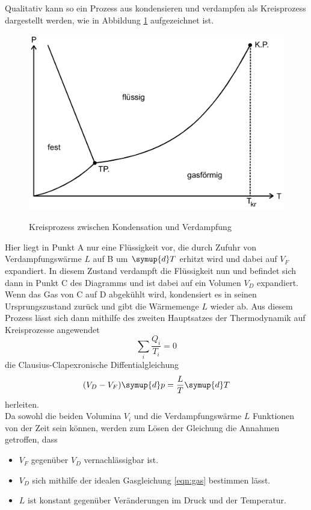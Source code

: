 \noindent Qualitativ kann so ein Prozess aus kondensieren und verdampfen als Kreisprozess dargestellt werden, wie
in Abbildung \ref{kreisprozess} aufgezeichnet ist.
\begin{figure}[H]
    \centering
    \caption{Kreisprozess zwischen Kondensation und Verdampfung}%
    \includegraphics{Bilder/Phasendiagramm}
    \label{kreisprozess}
\end{figure}
\noindent Hier liegt in Punkt A nur eine Flüssigkeit vor, die durch Zufuhr von Verdampfungswärme $L$ auf B um $\symup{d}T$ erhitzt wird 
und dabei auf $V_F$ expandiert. In diesem Zustand verdampft die Flüssigkeit nun und befindet sich dann in Punkt C des Diagramms 
und ist dabei auf ein Volumen $V_D$ expandiert. Wenn das Gas von C auf D abgekühlt wird, kondensiert es in seinen Ursprungszustand 
zurück und gibt die Wärmemenge $L$ wieder ab. Aus diesem Prozess lässt sich dann mithilfe des zweiten Hauptsatzes der Thermodynamik
auf Kreisprozesse angewendet
\begin{equation*}
    \sum_i \frac{Q_i}{T_i}=0
\end{equation*}
die Clausius-Clapexronische Diffentialgleichung
\begin{equation}
    (V_D-V_F)\symup{d}p=\frac{L}{T}\symup{d}T
    \label{eqn:clausius}
\end{equation}
herleiten.\\

\noindent Da sowohl die beiden Volumina $V_i$ und die Verdampfungswärme $L$ Funktionen von der Zeit sein können, werden zum 
Lösen der Gleichung die Annahmen getroffen, dass
\begin{itemize}
    \item $V_F$ gegenüber $V_D$ vernachlässigbar ist.
    \item $V_D$ sich mithilfe der idealen Gasgleichung \ref{eqn:gas} bestimmen lässt. 
    \item $L$ ist konstant gegenüber Veränderungen im Druck und der Temperatur.
\end{itemize}

